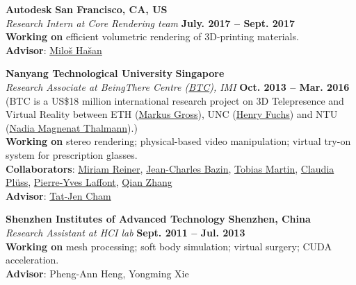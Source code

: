 \documentclass[margin,line]{resume}
\begin{document}
\begin{resume}
    \vspace{0.0mm}

    \textbf{Autodesk} \hfill \textbf{San Francisco, CA, US} \\
    \textsl{Research Intern at Core Rendering team} \hfill \textbf{July. 2017 -- Sept. 2017}\\
    \textbf{Working on} efficient volumetric rendering of 3D-printing materials.\\
    \textbf{Advisor}: \href{http://miloshasan.net/}{Milo\v{s} Ha\v{s}an}       
    
    \vspace{0.0mm}
    
    \textbf{Nanyang Technological University} \hfill \textbf{Singapore} \\
    \textsl{Research Associate at BeingThere Centre (\href{https://www.youtube.com/watch?v=Oy-xrxOB_4Q}{BTC}), IMI} \hfill \textbf{Oct. 2013 -- Mar. 2016}\\
    (BTC is a US\$18 million international research project on 3D Telepresence and Virtual Reality between ETH (\href{https://en.wikipedia.org/wiki/Markus_Gross}{Markus Gross}), UNC (\href{https://en.wikipedia.org/wiki/Henry_Fuchs}{Henry Fuchs}) and
    NTU (\href{https://en.wikipedia.org/wiki/Nadia_Magnenat_Thalmann}{Nadia Magnenat Thalmann}).)\\
    \textbf{Working on} stereo rendering; physical-based video manipulation; virtual try-on system for prescription glasses. \\
    \textbf{Collaborators}: \href{http://vrneurocog.wixsite.com/vrneurocog}{Miriam Reiner},
    \href{https://scholar.google.com/citations?user=XPZLx-8AAAAJ&hl=en}{Jean-Charles Bazin},
    \href{https://www.virtamed.com/en/about-us/team/tobias-martin-phd/}{Tobias Martin},
    \href{https://www.crunchbase.com/person/claudia-pluss}{Claudia Pl\"{u}ss},
    \href{http://www.py-laffont.info/}{Pierre-Yves Laffont},
    \href{https://qianzhanginfo.github.io/}{Qian Zhang} \\
    \textbf{Advisor}: \href{http://www.ntu.edu.sg/home/astjcham/}{Tat-Jen Cham} 

    \vspace{0.0mm}
    
    \textbf{Shenzhen Institutes of Advanced Technology}   \hfill \textbf{Shenzhen, China} \\
    \textsl{Research Assistant at HCI lab} \hfill \textbf{Sept. 2011 -- Jul. 2013} \\
    \textbf{Working on} mesh processing; soft body simulation; virtual surgery; CUDA acceleration. \\
    \textbf{Advisor}: Pheng-Ann Heng, Yongming Xie \\


\end{resume}
\end{document}
